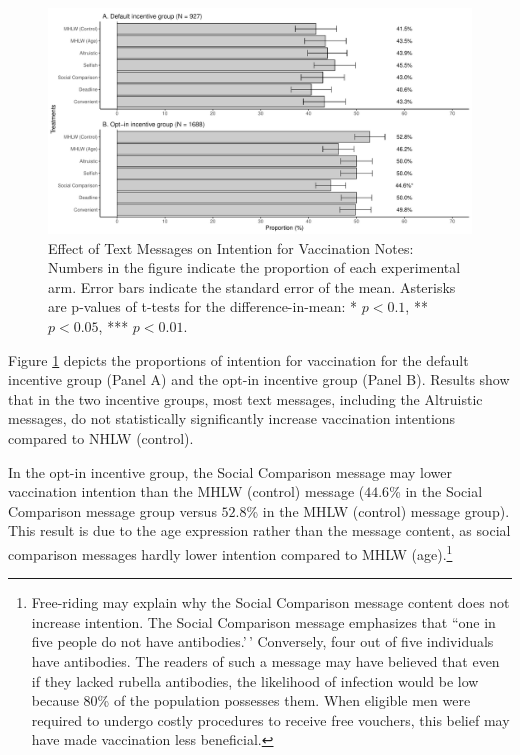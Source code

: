 \documentclass[
]{article}
\begin{document}
\begin{figure}
\centering
\includegraphics{discussion-paper_files/figure-latex/ttest-int-vacc-1.pdf}
\caption{\label{fig:ttest-int-vacc}Effect of Text Messages on Intention for Vaccination Notes: Numbers in the figure indicate the proportion of each experimental arm. Error bars indicate the standard error of the mean. Asterisks are p-values of t-tests for the difference-in-mean: * \(p < 0.1\), ** \(p < 0.05\), *** \(p < 0.01\).}
\end{figure}

Figure \ref{fig:ttest-int-vacc} depicts the proportions of intention for vaccination for the default incentive group (Panel A) and the opt-in incentive group (Panel B). Results show that in the two incentive groups, most text messages, including the Altruistic messages, do not statistically significantly increase vaccination intentions compared to NHLW (control).

In the opt-in incentive group, the Social Comparison message may lower vaccination intention than the MHLW (control) message (\(44.6\)\% in the Social Comparison message group versus \(52.8\)\% in the MHLW (control) message group). This result is due to the age expression rather than the message content, as social comparison messages hardly lower intention compared to MHLW (age).\footnote{Free-riding may explain why the Social Comparison message content does not increase intention. The Social Comparison message emphasizes that ``one in five people do not have antibodies.'\,' Conversely, four out of five individuals have antibodies. The readers of such a message may have believed that even if they lacked rubella antibodies, the likelihood of infection would be low because 80\% of the population possesses them. When eligible men were required to undergo costly procedures to receive free vouchers, this belief may have made vaccination less beneficial.}
\end{document}
